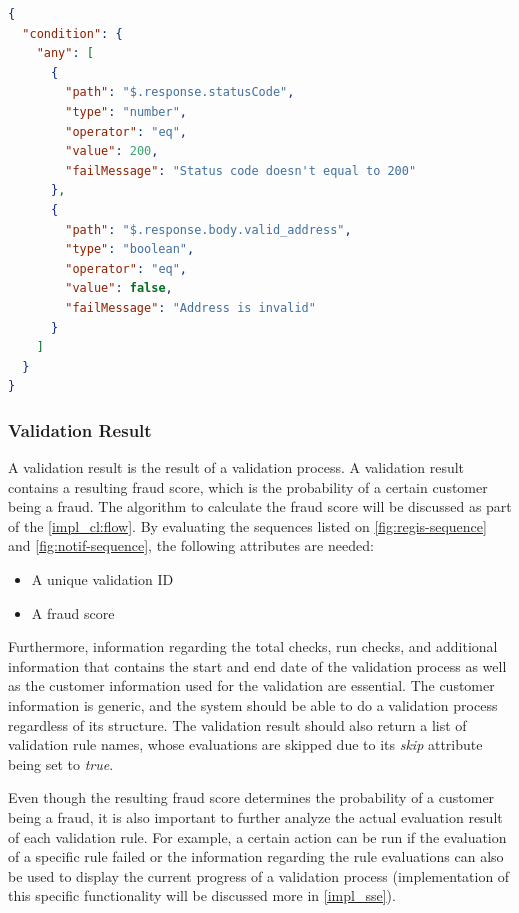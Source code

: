     \begin{lstlisting}[caption={Validation rule \textbf{condition} attribute example with ANY condition (JSON)}, language=json]
{
  "condition": {
    "any": [
      {
        "path": "$.response.statusCode",
        "type": "number",
        "operator": "eq",
        "value": 200,
        "failMessage": "Status code doesn't equal to 200"
      },
      {
        "path": "$.response.body.valid_address",
        "type": "boolean",
        "operator": "eq",
        "value": false,
        "failMessage": "Address is invalid"
      }
    ]
  }
}
    \end{lstlisting}

  \subsubsection{Validation Result}

    A validation result is the result of a validation process. A validation result contains a resulting fraud score, which is the probability of a certain customer being a fraud. The algorithm to calculate the fraud score will be discussed as part of the \autoref{impl_cl:flow}.
    By evaluating the sequences listed on \autoref{fig:regis-sequence} and \autoref{fig:notif-sequence}, the following attributes are needed:

    \begin{itemize}
      \item A unique validation ID
      \item A fraud score 
    \end{itemize}

    Furthermore, information regarding the total checks, run checks, and additional information that contains the start and end date of the validation process as well as the customer information used for the validation are essential. The customer information is generic, and the system should be able to do a validation process regardless of its structure. The validation result should also return a list of validation rule names, whose evaluations are skipped due to its \emph{skip} attribute being set to \emph{true}.

    Even though the resulting fraud score determines the probability of a customer being a fraud, it is also important to further analyze the actual evaluation result of each validation rule. For example, a certain action can be run if the evaluation of a specific rule failed or the information regarding the rule evaluations can also be used to display the current progress of a validation process (implementation of this specific functionality will be discussed more in \autoref{impl_sse}). 

